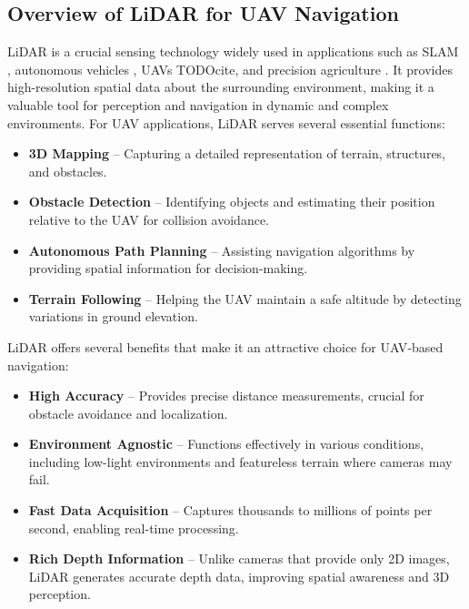         \subsection{Overview of LiDAR for UAV Navigation}
            \ac{LiDAR} is a crucial sensing technology widely used in applications such as SLAM \cite{pointlio_mrs}, autonomous vehicles \cite{Lidar_autonomous_vehicles}, UAVs TODOcite, and precision agriculture \cite{Lidar_agriculture}. 
            It provides high-resolution spatial data about the surrounding environment, making it a valuable tool for perception and navigation in dynamic and complex environments.  
            For UAV applications, \ac{LiDAR} serves several essential functions:  
            \begin{itemize}  
                \item \textbf{3D Mapping} -- Capturing a detailed representation of terrain, structures, and obstacles.  
                \item \textbf{Obstacle Detection} -- Identifying objects and estimating their position relative to the \ac{UAV} for collision avoidance.  
                \item \textbf{Autonomous Path Planning} -- Assisting navigation algorithms by providing spatial information for decision-making.  
                \item \textbf{Terrain Following} -- Helping the \ac{UAV} maintain a safe altitude by detecting variations in ground elevation.  
            \end{itemize}  

            \ac{LiDAR} offers several benefits that make it an attractive choice for \ac{UAV}-based navigation:  
            \begin{itemize}  
                \item \textbf{High Accuracy} -- Provides precise distance measurements, crucial for obstacle avoidance and localization.  
                \item \textbf{Environment Agnostic} -- Functions effectively in various conditions, including low-light environments and featureless terrain where cameras may fail.  
                \item \textbf{Fast Data Acquisition} -- Captures thousands to millions of points per second, enabling real-time processing.  
                \item \textbf{Rich Depth Information} -- Unlike cameras that provide only 2D images, \ac{LiDAR} generates accurate depth data, improving spatial awareness and 3D perception.  
            \end{itemize}  

